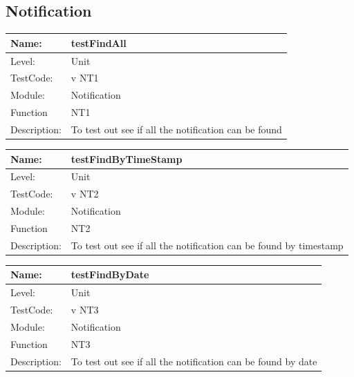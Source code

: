 \documentclass[12pt]{article}
\begin{document}
\begin{flushleft}
\subsection{Notification}
\begin{center}
\begin{tabular}{|l|p{12cm}|}
\hline

 Name: & testFindAll  \\
\hline
Level: & Unit \\
\hline
TestCode: & v NT1 \\
\hline
Module:& Notification\\
\hline
Function & NT1 \\
\hline
Description: & To test out see if all the notification can be found \\
\hline

\end{tabular}
\end{center}

\begin{center}
\begin{tabular}{|l|p{12cm}|}
\hline

 Name: & testFindByTimeStamp  \\
\hline
Level: & Unit \\
\hline
TestCode: & v NT2 \\
\hline
Module:& Notification\\
\hline
Function & NT2 \\
\hline
Description: & To test out see if all the notification can be found by timestamp \\
\hline

\end{tabular}
\end{center}

\begin{center}
\begin{tabular}{|l|p{12cm}|}
\hline

 Name: & testFindByDate  \\
\hline
Level: & Unit \\
\hline
TestCode: & v NT3 \\
\hline
Module:& Notification\\
\hline
Function & NT3 \\
\hline
Description: & To test out see if all the notification can be found by date \\
\hline


\end{tabular}
\end{center}
\end{flushleft}
\end{document}
